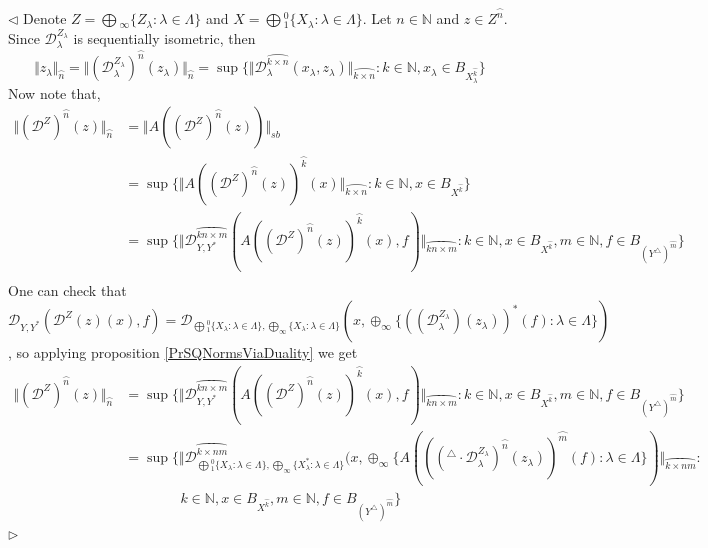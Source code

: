 \documentclass[12pt]{article}
\newenvironment{proof}{\par $\triangleleft$}{$\triangleright$}
\begin{document}
\begin{proof} Denote $Z=\bigoplus{}_\infty\{Z_\lambda:\lambda\in\Lambda\}$ and $X=\bigoplus{}_1^0\{X_\lambda:\lambda\in\Lambda\}$. Let $n\in\mathbb{N}$ and $z\in Z^{\wideparen{n}}$. Since $\mathcal{D}_\lambda^{Z_\lambda}$ is sequentially isometric, then
$$
\Vert z_\lambda\Vert_{\wideparen{n}}
=\Vert (\mathcal{D}_\lambda^{Z_\lambda})^{\wideparen{n}}(z_\lambda)\Vert_{\wideparen{n}}
=\sup\{\Vert \mathcal{D}_\lambda^{\wideparen{k\times n}}(x_\lambda,z_\lambda)\Vert_{\wideparen{k\times n}}:k\in\mathbb{N},x_\lambda\in B_{X_\lambda^{\wideparen{k}}}\}
$$
Now note that,
$$
\begin{aligned}
\Vert(\mathcal{D}^Z)^{\wideparen{n}}(z)\Vert_{\wideparen{n}}
&=\Vert A((\mathcal{D}^Z)^{\wideparen{n}}(z))\Vert_{sb}\\
&=\sup\{\Vert A((\mathcal{D}^Z)^{\wideparen{n}}(z))^{\wideparen{k}}(x)\Vert_{\wideparen{k\times n}}:k\in\mathbb{N},x\in B_{X^{\wideparen{k}}}\}\\
&=\sup\{\Vert \mathcal{D}_{Y,Y^*}^{\wideparen{kn\times m}}(A((\mathcal{D}^Z)^{\wideparen{n}}(z))^{\wideparen{k}}(x),f)\Vert_{\wideparen{kn\times m}}:k\in\mathbb{N},x\in B_{X^{\wideparen{k}}},m\in\mathbb{N},f\in B_{(Y^\triangle)^{\wideparen{m}}}\}\\
\end{aligned}
$$
One can check that $\mathcal{D}_{Y,Y^*}(\mathcal{D}^Z(z)(x),f)=\mathcal{D}_{\bigoplus{}_1^0\{X_\lambda:\lambda\in\Lambda\},\bigoplus_\infty\{X_\lambda:\lambda\in\Lambda\}}(x,\oplus_\infty\{((\mathcal{D}_\lambda^{Z_\lambda})(z_\lambda))^*(f):\lambda\in\Lambda\})$, so applying proposition \ref{PrSQNormsViaDuality} we get
$$
\begin{aligned}
\Vert(\mathcal{D}^Z)^{\wideparen{n}}(z)\Vert_{\wideparen{n}}
&=\sup\{\Vert \mathcal{D}_{Y,Y^*}^{\wideparen{kn\times m}}(A((\mathcal{D}^Z)^{\wideparen{n}}(z))^{\wideparen{k}}(x),f)\Vert_{\wideparen{kn\times m}}:k\in\mathbb{N},x\in B_{X^{\wideparen{k}}},m\in\mathbb{N},f\in B_{(Y^\triangle)^{\wideparen{m}}}\}\\
&=\sup\{\Vert \mathcal{D}_{\bigoplus{}_1^0\{X_\lambda:\lambda\in\Lambda\},\bigoplus_\infty\{X_\lambda^*:\lambda\in\Lambda\}}^{\wideparen{k\times nm}}(x,\oplus_\infty\{A((({}^\triangle\cdot\mathcal{D}_\lambda^{Z_\lambda})^{\wideparen{n}}(z_\lambda))^{\wideparen{m}}(f):\lambda\in\Lambda\})\Vert_{\wideparen{k\times nm}}: \\
&\qquad\qquad k\in\mathbb{N},x\in B_{X^{\wideparen{k}}},m\in\mathbb{N},f\in B_{(Y^\triangle)^{\wideparen{m}}}\}\\

\end{aligned}$$
\end{proof}
\end{document}
